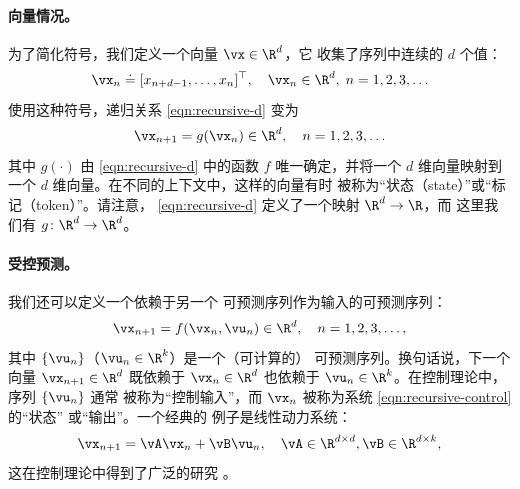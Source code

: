 \documentclass[../../book-main_zh.tex]{subfiles}
\begin{document}
\paragraph{向量情况。}
为了简化符号，我们定义一个向量 \(\vx \in \R^{d}\)，它
收集了序列中连续的 \(d\) 个值：
\begin{equation}
    \vx_{n} \doteq [x_{n+d-1}, \ldots, x_{n}]^{\top}, \quad \vx_{n}
    \in \R^{d}, \; n = 1, 2, 3, \ldots
\end{equation}
使用这种符号，递归关系 \eqref{eqn:recursive-d} 变为
\begin{equation}
    \vx_{n+1} = g(\vx_{n}) \in \R^{d}, \quad n = 1, 2, 3, \ldots
    \label{eqn:recursive-v}
\end{equation}
其中 \(g(\cdot)\) 由 \eqref{eqn:recursive-d} 中的函数 \(f\)
唯一确定，并将一个 \(d\) 维向量映射到一个
\(d\) 维向量。在不同的上下文中，这样的向量有时
被称为“状态（state）”或“标记（token）”。请注意，
\eqref{eqn:recursive-d} 定义了一个映射 \(\R^{d} \to \R\)，而
这里我们有 \(g \colon \R^{d} \to \R^{d}\)。

\paragraph{受控预测。}
我们还可以定义一个依赖于另一个
可预测序列作为输入的可预测序列：
\begin{equation}
    \vx_{n+1} = f(\vx_{n}, \vu_{n}) \in \R^{d}, \quad n = 1, 2, 3, \ldots,
    \label{eqn:recursive-control}
\end{equation}
其中 \(\{\vu_{n}\}\)（\(\vu_{n} \in \R^{k}\)）是一个（可计算的）
可预测序列。换句话说，下一个向量 \(\vx_{n+1} \in
\R^{d}\) 既依赖于 \(\vx_{n} \in \R^{d}\) 也依赖于 \(\vu_{n} \in
\R^{k}\)。在控制理论中，序列 \(\{\vu_{n}\}\) 通常
被称为“控制输入”，而 \(\vx_{n}\) 被称为系统 \eqref{eqn:recursive-control} 的“状态”
或“输出”。一个经典的
例子是线性动力系统：
\begin{equation}
    \vx_{n+1} = \vA\vx_{n} + \vB\vu_{n}, \quad \vA \in \R^{d \times
    d}, \vB \in \R^{d \times k},
    \label{eqn:lineary-system}
\end{equation}
这在控制理论中得到了广泛的研究 \cite{Cal:Des}。
\end{document}
